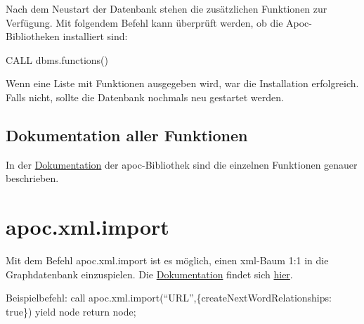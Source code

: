 \documentclass[ngerman,]{scrreprt}
\begin{document}
Nach dem Neustart der Datenbank stehen die zusätzlichen Funktionen zur Verfügung. Mit folgendem Befehl kann überprüft werden, ob die Apoc-Bibliotheken installiert sind:

CALL dbms.functions()

Wenn eine Liste mit Funktionen ausgegeben wird, war die Installation erfolgreich. Falls nicht, sollte die Datenbank nochmals neu gestartet werden.

\subsection{Dokumentation aller Funktionen}\label{dokumentation-aller-funktionen}

In der \href{https://neo4j-contrib.github.io/neo4j-apoc-procedures/}{Dokumentation} der apoc-Bibliothek sind die einzelnen Funktionen genauer beschrieben.

\section{apoc.xml.import}\label{apoc.xml.import}

Mit dem Befehl apoc.xml.import ist es möglich, einen xml-Baum 1:1 in die Graphdatenbank einzuspielen. Die \href{https://neo4j-contrib.github.io/neo4j-apoc-procedures/\#_import_xml_directly}{Dokumentation} findet sich \href{https://neo4j-contrib.github.io/neo4j-apoc-procedures/\#_import_xml_directly}{hier}.

Beispielbefehl: call apoc.xml.import(``URL'',\{createNextWordRelationships: true\}) yield node return node;
\end{document}
